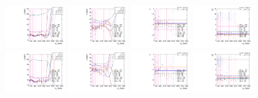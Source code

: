 \begin{figure}[htbp]
  \centering
  \includegraphics[width=0.2\textwidth]{fig/2Dfit/paramSignalShape_allSig_MJJ_HP_bb_LDy_mean.pdf}
  \includegraphics[width=0.2\textwidth]{fig/2Dfit/paramSignalShape_allSig_MJJ_HP_bb_LDy_sigma.pdf}
  \includegraphics[width=0.2\textwidth]{fig/2Dfit/paramSignalShape_allSig_MJJ_HP_bb_LDy_alpha.pdf}
  \includegraphics[width=0.2\textwidth]{fig/2Dfit/paramSignalShape_allSig_MJJ_HP_bb_LDy_alpha2.pdf}\\
  \includegraphics[width=0.2\textwidth]{fig/2Dfit/paramSignalShape_allSig_MJJ_LP_bb_LDy_mean.pdf}
  \includegraphics[width=0.2\textwidth]{fig/2Dfit/paramSignalShape_allSig_MJJ_LP_bb_LDy_sigma.pdf}
  \includegraphics[width=0.2\textwidth]{fig/2Dfit/paramSignalShape_allSig_MJJ_LP_bb_LDy_alpha.pdf}
  \includegraphics[width=0.2\textwidth]{fig/2Dfit/paramSignalShape_allSig_MJJ_LP_bb_LDy_alpha2.pdf}\\

\end{figure}

